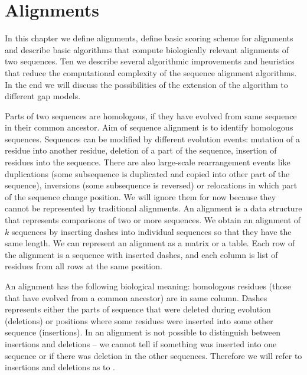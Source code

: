 \chapter{Alignments}
\label{CHAPTER:ALIGNMENT}
In this chapter we define alignments, define basic scoring scheme for alignments
and describe basic algorithms that compute biologically relevant alignments of
two sequences. Ten we describe several algorithmic improvements and heuristics
that reduce the computational complexity of the sequence alignment algorithms.
In the end we will discuss the possibilities of the extension of the algorithm
to different gap models.

Parts of two sequences are homologous, if they have evolved from same sequence
in their common ancestor. Aim of sequence alignment is to identify homologous
sequences. Sequences can be modified by different evolution events:
mutation of a residue into another residue, deletion of a part of the sequence,
insertion of residues into the sequence. There are also large-scale
rearrangement events like duplications (some subsequence is duplicated and
copied into other part of the sequence), inversions (some subsequence is
reversed) or relocations in which part of the sequence change position.  We will
ignore them for now because they cannot be represented by traditional
alignments. An alignment is a data structure that represents comparisons of two
or more sequences. We obtain an alignment of $k$ sequences by inserting dashes
into individual sequences so that they have the same length. We can represent an
alignment as a matrix or a table. Each row of the alignment is a sequence with
inserted dashes, and each column is list of residues from all rows at the same
position.


An alignment has the following biological meaning: homologous residues (those that
have evolved from a common ancestor) are in same column. Dashes represents
either the parts of sequence that were deleted during evolution (deletions) or
positions where some residues were inserted into some other sequence
(insertions). In an alignment is not possible to distinguish between insertions and
deletions -- we cannot tell if something was inserted into one sequence or if
there was deletion in the other sequences. Therefore we will refer to insertions
and deletions as to .

